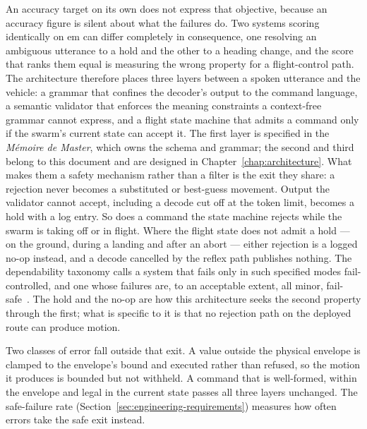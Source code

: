 An accuracy target on its own does not express that objective, because an accuracy figure is
silent about what the failures do. Two systems scoring identically on \gls{em} can differ
completely in consequence, one resolving an ambiguous utterance to a hold and the other to a
heading change, and the score that ranks them equal is measuring the wrong property for a
flight-control path. The architecture therefore places three layers between a spoken utterance and
the vehicle: a grammar that confines the decoder's output to the command language, a semantic
validator that enforces the meaning constraints a context-free grammar cannot express, and a flight
state machine that admits a command only if the swarm's current state can accept it. The first
layer is specified in the \emph{M\'emoire de Master}, which owns the schema and grammar; the second
and third belong to this document and are designed in Chapter~\ref{chap:architecture}. What makes
them a safety mechanism rather than a filter is the exit they share: a rejection never becomes a
substituted or best-guess movement. Output the validator cannot accept, including a decode cut off
at the token limit, becomes a hold with a log entry. So does a command the state machine rejects
while the swarm is taking off or in flight. Where the flight state does not admit a hold --- on the
ground, during a landing and after an abort --- either rejection is a logged no-op instead, and a
decode cancelled by the reflex path publishes nothing. The dependability taxonomy calls a system
that fails only in such specified modes fail-controlled, and one whose failures are, to an
acceptable extent, all minor, fail-safe~\cite{avizienis2004}. The hold and the no-op are how this
architecture seeks the second property through the first; what is specific to it is that no
rejection path on the deployed route can produce motion.

Two classes of error fall outside that exit. A value outside the physical envelope is clamped to
the envelope's bound and executed rather than refused, so the motion it produces is bounded but not
withheld. A command that is well-formed, within the envelope and legal in the current state passes
all three layers unchanged. The safe-failure rate (Section~\ref{sec:engineering-requirements})
measures how often errors take the safe exit instead.

